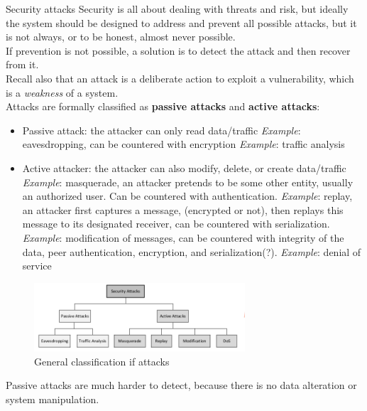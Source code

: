 \begin{section}{Security attacks}
  Security is all about dealing with threats and risk, but ideally the system should be designed 
  to address and prevent all possible attacks, but it is not always, or to be honest, almost never possible.\\
  If prevention is not possible, a solution is to detect the attack and then recover from it.\\
  Recall also that an attack is a deliberate action to exploit a vulnerability, which is a 
  \textit{weakness} of a system.\\
  Attacks are formally classified as \textbf{passive attacks} and \textbf{active attacks}:
  \begin{itemize}
    \item Passive attack: the attacker can only read data/traffic
      \subitem \textit{Example}: eavesdropping, can be countered with encryption
      \subitem \textit{Example}: traffic analysis
    \item Active attacker: the attacker can also modify, delete, or create data/traffic
      \subitem \textit{Example}: masquerade, an attacker pretends to be some other entity, usually 
      an authorized user. Can be countered with authentication.
      \subitem \textit{Example}: replay, an attacker first captures a message, (encrypted or not),
      then replays this message to its designated receiver, can be countered with serialization.
      \subitem \textit{Example}: modification of messages, can be countered with integrity of the 
      data, peer authentication, encryption, and serialization(?).
      \subitem \textit{Example}: denial of service
  \end{itemize}
  \begin{figure}[h]
    \centering
    \includegraphics[width=0.7\textwidth]{img/wireless/attacks classification.png}
    \caption{General classification if attacks}
  \end{figure}

  Passive attacks are much harder to detect, because there is no data alteration or system
  manipulation.

\end{section}
